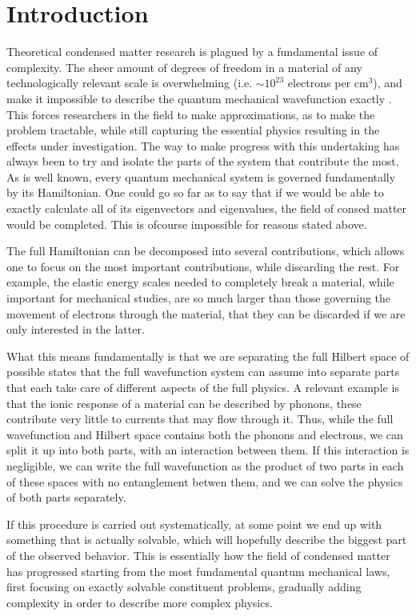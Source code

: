\chapter{Introduction}
Theoretical condensed matter research is plagued by a fundamental issue of complexity. The sheer amount of degrees of freedom in a material of any technologically relevant scale is overwhelming (i.e. $\sim10^{23}$ electrons per cm$^3$), and make it impossible to describe the quantum mechanical wavefunction exactly . This forces researchers in the field to make approximations, as to make the problem tractable, while still capturing the essential physics resulting in the effects under investigation.
The way to make progress with this undertaking has always been to try and isolate the parts of the system that contribute the most. As is well known, every quantum mechanical system is governed fundamentally by its Hamiltonian. One could go so far as to say that if we would be able to exactly calculate all of its eigenvectors and eigenvalues, the field of consed matter would be completed. This is ofcourse impossible for reasons stated above.

The full Hamiltonian can be decomposed into several contributions, which allows one to focus on the most important contributions, while discarding the rest. For example, the elastic energy scales needed to completely break a material, while important for mechanical studies, are so much larger than those governing the movement of electrons through the material, that they can be discarded if we are only interested in the latter.

What this means fundamentally is that we are separating the full Hilbert space of possible states that the full wavefunction system can assume into separate parts that each take care of different aspects of the full physics. A relevant example is that the ionic response of a material can be described by phonons, these contribute very little to currents that may flow through it. Thus, while the full wavefunction and Hilbert space contains both the phonons and electrons, we can split it up into both parts, with an interaction between them. If this interaction is negligible, we can write the full wavefunction as the product of two parts in each of these spaces with no entanglement betwen them, and we can solve the physics of both parts separately.

If this procedure is carried out systematically, at some point we end up with something that is actually solvable, which will hopefully describe the biggest part of the observed behavior. This is essentially how the field of condensed matter has progressed starting from the most fundamental quantum mechanical laws, first focusing on exactly solvable constituent problems, gradually adding complexity in order to describe more complex physics.

